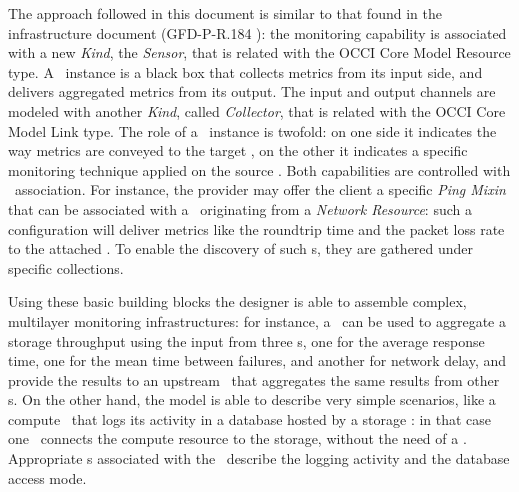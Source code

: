 \documentclass[12pt]{article}  %
\begin{document}
The approach followed in this document is similar to that found in the infrastructure document (GFD-P-R.184 \cite{occi:infr}): the monitoring capability is associated with a new {\em Kind}, the {\em Sensor}, that is related with the OCCI Core Model Resource type. A \sens\ instance is a black box that collects metrics from its input side, and delivers aggregated metrics from its output. The input and output channels are modeled with another {\em Kind}, called {\em Collector}, that is related with the OCCI Core Model Link type. The role of a \coll\ instance is twofold: on one side it indicates the way metrics are conveyed to the target \rs, on the other it indicates a specific monitoring technique applied on the source \rs. Both capabilities are controlled with \mi\ association. For instance, the provider may offer the client a specific {\em Ping Mixin} that can be associated with a \coll\ originating from a {\em Network Resource}: such a configuration will deliver metrics like the roundtrip time and the packet loss rate to the attached \sens. To enable the discovery of such \mi s, they are gathered under specific collections.  

Using these basic building blocks the designer is able to assemble complex, multilayer monitoring infrastructures: for instance, a \sens\ can be used to aggregate a storage throughput using the input from three \coll s, one for the average response time, one for the mean time between failures, and another for network delay, and provide the results to an upstream \sens\ that aggregates the same results from other \sens s. On the other hand, the model is able to describe very simple scenarios, like a compute \rs\ that logs its activity in a database hosted by a storage \rs: in that case one \coll\ connects the compute resource to the storage, without the need of a \sens. Appropriate \mi s associated with the \coll\ describe the logging activity and the database access mode.
\end{document}
